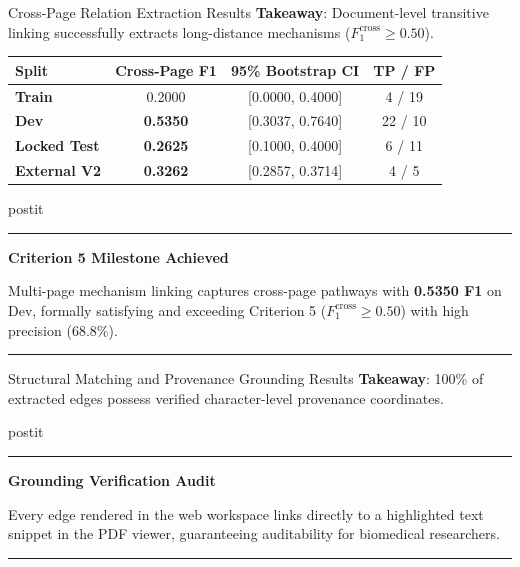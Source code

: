 \documentclass[aspectratio=43,10pt]{beamer}
\newcommand{\card}[4][\linewidth]{%
  \begin{beamercolorbox}[wd=#1,sep=0pt,rounded=false,shadow=false]{postit}%
    {\color{#3}\rule{\linewidth}{1.5pt}}\par
    \colorbox{slatebg}{%
      \begin{minipage}{\dimexpr#1-8pt\relax}%
        \vspace{1.5pt}%
        {\footnotesize\bfseries\color{#3}#2}\vspace{1.5pt}\par%
        {\scriptsize\color{darktext}#4}%
        \vspace{1.5pt}%
      \end{minipage}%
    }%
    \par{\color{bordergray}\rule{\linewidth}{0.6pt}}%
  \end{beamercolorbox}%
}
\begin{document}
\begin{frame}{Cross-Page Relation Extraction Results}
  \textbf{Takeaway}: Document-level transitive linking successfully extracts long-distance mechanisms ($F_1^{\text{cross}} \ge 0.50$).
  \vspace{0.15cm}
  \begin{center}
    \small
    \renewcommand{\arraystretch}{1.15}
    \begin{tabular}{l ccc}
      \toprule
      \textbf{\color{navy}Split} & \textbf{\color{navy}Cross-Page F1} & \textbf{\color{navy}95\% Bootstrap CI} & \textbf{\color{navy}TP / FP} \\
      \midrule
      \textbf{Train} & 0.2000 & [0.0000, 0.4000] & 4 / 19 \\
      \textbf{Dev} & \textbf{0.5350} & [0.3037, 0.7640] & 22 / 10 \\
      \textbf{Locked Test} & \textbf{0.2625} & [0.1000, 0.4000] & 6 / 11 \\
      \textbf{External V2} & \textbf{0.3262} & [0.2857, 0.3714] & 4 / 5 \\
      \bottomrule
    \end{tabular}
  \end{center}
  \vspace{0.15cm}
  \card{Criterion 5 Milestone Achieved}{green}{
    Multi-page mechanism linking captures cross-page pathways with \textbf{0.5350 F1} on Dev, formally satisfying and exceeding Criterion 5 ($F_1^{\text{cross}} \ge 0.50$) with high precision (68.8\%).
  }
\end{frame}

\begin{frame}{Structural Matching and Provenance Grounding Results}
  \textbf{Takeaway}: 100\% of extracted edges possess verified character-level provenance coordinates.
  \vspace{0.18cm}
  \begin{center}
  \end{center}
  \vspace{0.18cm}
  \card{Grounding Verification Audit}{navy}{
    Every edge rendered in the web workspace links directly to a highlighted text snippet in the PDF viewer, guaranteeing auditability for biomedical researchers.
  }
\end{frame}
\end{document}
